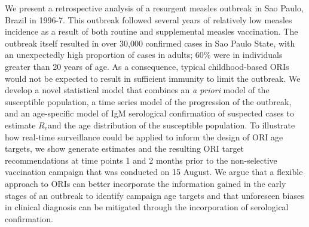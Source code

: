 We present a retrospective analysis of a resurgent measles outbreak in
Sao Paulo, Brazil in 1996-7. This outbreak followed several years of
relatively low measles incidence as a result of both routine and
supplemental measles vaccination. The outbreak itself resulted in over
30,000 confirmed cases in Sao Paulo State, with an unexpectedly high
proportion of cases in adults; 60\% were in individuals greater than 20
years of age. As a consequence, typical childhood-based ORIs would not
be expected to result in sufficient immunity to limit the outbreak. We
develop a novel statistical model that combines an \emph{a priori} model
of the susceptible population, a time series model of the progression of
the outbreak, and an age-specific model of IgM serological confirmation
of suspected cases to estimate \(R_{e}\)and the age distribution of the
susceptible population. To illustrate how real-time surveillance could
be applied to inform the design of ORI age targets, we show generate
estimates and the resulting ORI target recommendations at time points 1
and 2 months prior to the non-selective vaccination campaign that was
conducted on 15 August. We argue that a flexible approach to ORIs can
better incorporate the information gained in the early stages of an
outbreak to identify campaign age targets and that unforeseen biases in
clinical diagnosis can be mitigated through the incorporation of
serological confirmation.